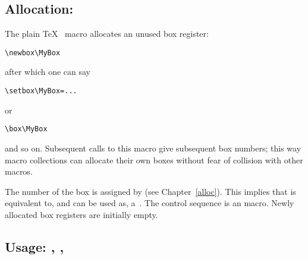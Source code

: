 \documentclass{book}
\begin{document}
\subsection{Allocation: }

The plain \TeX\  macro allocates an unused
box register:
\begin{verbatim}
\newbox\MyBox
\end{verbatim}
after which one can say
\begin{verbatim}
\setbox\MyBox=...
\end{verbatim}
or
\begin{verbatim}
\box\MyBox
\end{verbatim}
and so on.
Subsequent calls to this macro give subsequent box numbers;
this way macro collections can allocate their own boxes
without fear of collision with other macros.

The number of the box is assigned by 
(see Chapter~\ref{alloc}).
This implies that  is equivalent to,
and can be used as, a~.
The control sequence
\altt
{} is an  macro.
Newly allocated box registers are initially empty.


\subsection{Usage: , , }
\end{document}
